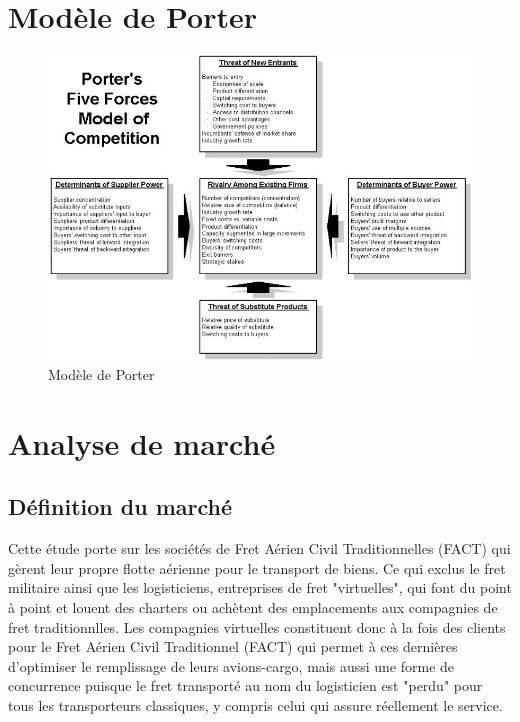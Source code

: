 \pagebreak

\section{Modèle de Porter}

\begin{figure}[H]
	\begin{center}
		\includegraphics[scale=0.48]{images/porter/porter_1}
		\caption{Modèle de Porter}
		\label{inclusion}
	\end{center}
\end{figure}

\section{Analyse de marché}

\subsection{Définition du marché}

Cette étude porte sur les sociétés de Fret Aérien Civil Traditionnelles (FACT) qui gèrent leur propre flotte aérienne pour le transport de biens. Ce qui exclus le fret militaire ainsi que les logisticiens, entreprises de fret "virtuelles", qui font du point à point et louent des charters ou achètent des emplacements aux compagnies de fret traditionnlles. Les compagnies virtuelles constituent donc à la fois des clients pour le Fret Aérien Civil Traditionnel (FACT) qui permet à ces dernières d'optimiser le remplissage de leurs avions-cargo, mais aussi une forme de concurrence puisque le fret transporté au nom du logisticien est "perdu" pour tous les transporteurs classiques, y compris celui qui assure réellement le service. 

